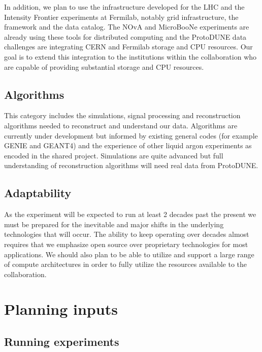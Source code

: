 \begin{enumerate}
In addition, we plan to use the infrastructure developed for the LHC and the Intensity Frontier experiments at Fermilab, notably grid infrastructure,  the  framework and the  data catalog.  The NOvA and MicroBooNe experiments are already using these tools for distributed computing and the ProtoDUNE data challenges are integrating CERN and Fermilab storage and CPU resources.  Our goal is to extend this integration to the  institutions within the collaboration who are capable of providing substantial storage and CPU resources. 



\subsection{Algorithms}
This category includes the simulations, signal processing and reconstruction algorithms needed to reconstruct and understand our data. Algorithms are currently under development but informed by existing general codes (for example GENIE and GEANT4) and the experience of other liquid argon experiments as encoded in the shared   project.  Simulations are quite advanced but full understanding of reconstruction algorithms will need real data from ProtoDUNE. 





\subsection{Adaptability}
As the experiment will be expected to run at least 2 decades past the present we must be prepared for the inevitable and major shifts in the underlying technologies that will occur. The ability to keep operating over decades almost requires that we emphasize open source over proprietary technologies for most applications.  We should also plan to be able to utilize and support a large range of compute architectures in order to fully utilize the resources available to the collaboration.






\section{Planning inputs}


\subsection{Running experiments}\label{sw:IF-input}


\end{enumerate}
